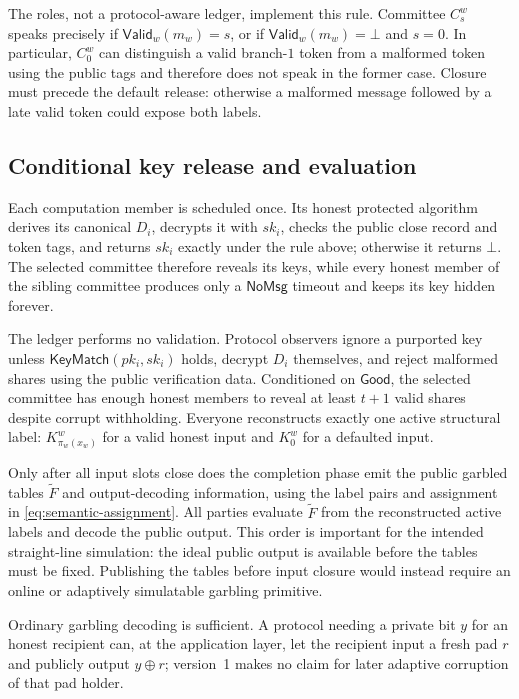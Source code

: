The roles, not a protocol-aware ledger, implement this rule.  Committee
$C^w_s$ speaks precisely if $\mathsf{Valid}_w(m_w)=s$, or if
$\mathsf{Valid}_w(m_w)=\bot$ and $s=0$.  In particular, $C^w_0$ can
distinguish a valid branch-$1$ token from a malformed token using the public
tags and therefore does not speak in the former case.  Closure must precede
the default release: otherwise a malformed message followed by a late valid
token could expose both labels.

\subsection{Conditional key release and evaluation}

Each computation member is scheduled once.  Its honest protected algorithm
derives its canonical $D_i$, decrypts it with $sk_i$, checks the public close
record and token tags, and returns $sk_i$ exactly under the rule above;
otherwise it returns $\bot$.  The selected committee therefore reveals its
keys, while every honest member of the sibling committee produces only a
$\mathsf{NoMsg}$ timeout and keeps its key hidden forever.

The ledger performs no validation.  Protocol observers ignore a purported
key unless $\mathsf{KeyMatch}(pk_i,sk_i)$ holds, decrypt $D_i$ themselves,
and reject malformed shares using the public verification data.  Conditioned
on $\mathsf{Good}$, the selected committee has enough honest members to reveal
at least $t+1$ valid shares despite corrupt withholding.  Everyone
reconstructs exactly one active structural label: $K^w_{\pi_w(x_w)}$ for a
valid honest input and $K^w_0$ for a defaulted input.

Only after all input slots close does the completion phase emit the public
garbled tables $\widetilde F$ and output-decoding information, using the
label pairs and assignment in \eqref{eq:semantic-assignment}.  All parties
evaluate $\widetilde F$ from the reconstructed active labels and decode the
public output.  This order is important for the intended straight-line
simulation: the ideal public output is available before the tables must be
fixed.  Publishing the tables before input closure would instead require an
online or adaptively simulatable garbling primitive.

Ordinary garbling decoding is sufficient.  A protocol needing a private bit
$y$ for an honest recipient can, at the application layer, let the recipient
input a fresh pad $r$ and publicly output $y\oplus r$; version~1 makes no
claim for later adaptive corruption of that pad holder.


